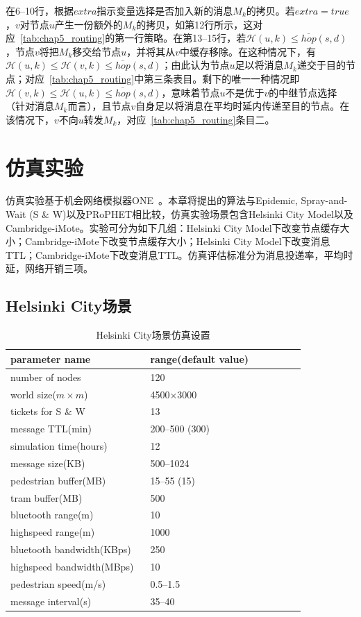 在6--10行，根据$extra$指示变量选择是否加入新的消息$M_k$的拷贝。若$extra=true$，$v$对节点$u$产生一份额外的$M_k$的拷贝，如第12行所示，这对应\tablename~\ref{tab:chap5_routing}的第一行策略。在第13--15行，若$\mathcal{H}(u,k)\leq\overline{hop}(s,d)$，节点$v$将把$M_k$移交给节点$u$，并将其从$v$中缓存移除。在这种情况下，有$\mathcal{H}(u,k)\leq\mathcal{H}(v,k)\leq\overline{hop}(s,d)$；由此认为节点$u$足以将消息$M_k$递交于目的节点；对应\tablename~\ref{tab:chap5_routing}中第三条表目。剩下的唯一一种情况即$\mathcal{H}(v,k)\leq\mathcal{H}(u,k)\leq\overline{hop}(s,d)$，意味着节点$u$不是优于$v$的中继节点选择（针对消息$M_k$而言），且节点$v$自身足以将消息在平均时延内传递至目的节点。在该情况下，$v$不向$u$转发$M_k$，对应\tablename~\ref{tab:chap5_routing}条目二。

\section{仿真实验}
\label{chap5:仿真实验}

仿真实验基于机会网络模拟器ONE~\cite{Keranen2009}。本章将提出的算法与Epidemic, Spray-and-Wait (S \& W)以及PRoPHET相比较，仿真实验场景包含Helsinki City Model以及Cambridge-iMote。实验可分为如下几组：Helsinki City Model下改变节点缓存大小；Cambridge-iMote下改变节点缓存大小；Helsinki City Model下改变消息TTL；Cambridge-iMote下改变消息TTL。仿真评估标准分为消息投递率，平均时延，网络开销三项。

\subsection{Helsinki City场景}



\begin{table}
\centering
\caption{Helsinki City场景仿真设置}
\label{tab:chap5_simulation_helsinki}
\begin{tabular}{
p{0.45\linewidth}<{\centering}
p{0.5\linewidth}<{\centering}
}
\hline
\textbf{parameter name} & \textbf{range(default value)} \\
\hline
number of nodes & 120  \\
world size($m\times m$) & 4500$\times$3000  \\
tickets for S \& W & 13 \\
message TTL(min) & 200--500 (300) \\
simulation time(hours) & 12 \\
message size(KB) & 500--1024 \\
pedestrian buffer(MB) & 15--55 (15) \\
tram buffer(MB) & 500 \\
bluetooth range(m) & 10 \\
highspeed range(m) & 1000 \\ 
bluetooth bandwidth(KBps) & 250 \\
highspeed bandwidth(MBps) & 10 \\ 
pedestrian speed(m/s) & 0.5--1.5  \\
message interval(s) & 35--40 \\
\hline
\end{tabular}
\end{table}

